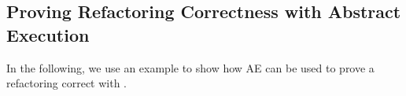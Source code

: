 
\subsection{Proving Refactoring Correctness with Abstract Execution}

In the following, we use an example to show how AE can be used to prove a refactoring correct with \Refinity{}. 

